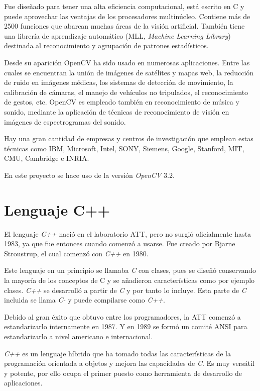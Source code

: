 Fue diseñado para tener una alta eficiencia computacional, está escrito en C y puede aprovechar las ventajas de los procesadores multinúcleo. Contiene más  de  2500  funciones  que  abarcan  muchas  áreas  de  la  visión  artificial.  También  tiene  una librería   de   aprendizaje   automático   (MLL,  \textit{Machine   Learning   Library})   destinada   al reconocimiento  y agrupación de patrones estadísticos.

Desde su aparición OpenCV ha sido usado en numerosas aplicaciones. Entre las cuales se encuentran la unión de imágenes de satélites y mapas web, la reducción de ruido en imágenes  médicas,  los  sistemas  de  detección  de movimiento,  la  calibración  de  cámaras,  el manejo  de  vehículos  no  tripulados, el  reconocimiento  de  gestos, etc. OpenCV  es  empleado también  en  reconocimiento  de  música  y  sonido,  mediante  la  aplicación  de  técnicas  de reconocimiento de visión en imágenes de espectrogramas del sonido.

Hay  una  gran  cantidad  de  empresas    y  centros  de  investigación  que  emplean  estas técnicas como IBM, Microsoft, Intel, SONY, Siemens, Google, Stanford, MIT, CMU, Cambridge e INRIA.

En este proyecto se hace uso de la versión \textit{OpenCV} 3.2.

\section{Lenguaje C++}

El lenguaje \textit{C++} nació en el laboratorio ATT, pero no surgió oficialmente hasta 1983, ya  que  fue  entonces  cuando  comenzó  a  usarse.  Fue  creado  por  Bjarne  Stroustrup,  el  cual comenzó con \textit{C++} en 1980. 

Este lenguaje en un principio se llamaba \textit{C} con clases, pues se diseñó conservando la mayoría de los conceptos de C y se añadieron características como por ejemplo clases. \textit{C++} se  desarrolló  a  partir  de  \textit{C}  y por tanto lo incluye. Esta  parte  de  \textit{C}  incluida se  llama  \textit{C-} y  puede compilarse como \textit{C++}.

Debido  al  gran  éxito  que  obtuvo  entre  los programadores,  la  ATT  comenzó  a estandarizarlo   internamente   en   1987. Y   en   1989   se   formó   un   comité   ANSI   para estandarizarlo a nivel americano e internacional.

\textit{C++}   es   un   lenguaje   híbrido   que   ha   tomado   todas   las   características   de   la programación  orientada  a objetos y  mejora  las  capacidades  de  \textit{C}. Es muy versátil y potente, por ello ocupa el primer puesto como herramienta de desarrollo de aplicaciones.


